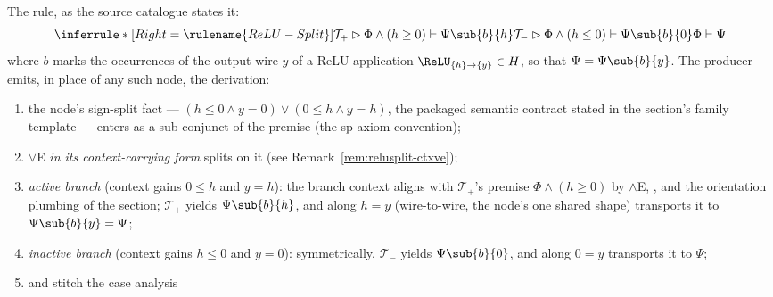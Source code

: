 

\begin{brecipe}
\label{rec:relusplit-instance}
The rule, as the source catalogue states it:
\[
\inferrule*[Right=\rulename{ReLU-Split}]{
  \mathcal{T}_{+} \rhd \Phi \wedge (h \geq 0) \vdash \Psi\sub{b}{h} \\
  \mathcal{T}_{-} \rhd \Phi \wedge (h \leq 0) \vdash \Psi\sub{b}{0}
}{
  \Phi \vdash \Psi
}
\]
where $b$ marks the occurrences of the output wire $y$ of a ReLU
application $\ReLU_{\{h\}\to\{y\}} \in H$, so that $\Psi =
\Psi\sub{b}{y}$. The producer emits, in place of any such node, the
derivation:
\begin{enumerate}
\item the node's sign-split fact --- $(h \leq 0 \wedge y = 0) \vee
  (0 \leq h \wedge y = h)$, the packaged semantic contract stated in
  the  section's family template --- enters as a
  sub-conjunct of the premise (the sp-axiom convention);
\item $\vee$E \emph{in its context-carrying form} splits on it (see
  Remark~\ref{rem:relusplit-ctxve});
\item \emph{active branch} (context gains $0 \leq h$ and $y = h$):
  the branch context aligns with $\mathcal{T}_{+}$'s premise $\Phi
  \wedge (h \geq 0)$ by $\wedge$E, , and the
  orientation plumbing of the  section;
  $\mathcal{T}_{+}$ yields $\Psi\sub{b}{h}$, and 
  along $h = y$ (wire-to-wire, the node's one shared shape)
  transports it to $\Psi\sub{b}{y} = \Psi$;
\item \emph{inactive branch} (context gains $h \leq 0$ and $y = 0$):
  symmetrically, $\mathcal{T}_{-}$ yields $\Psi\sub{b}{0}$, and
   along $0 = y$ transports it to $\Psi$;
\item {} and  stitch the case analysis

\end{enumerate}
\end{brecipe}
